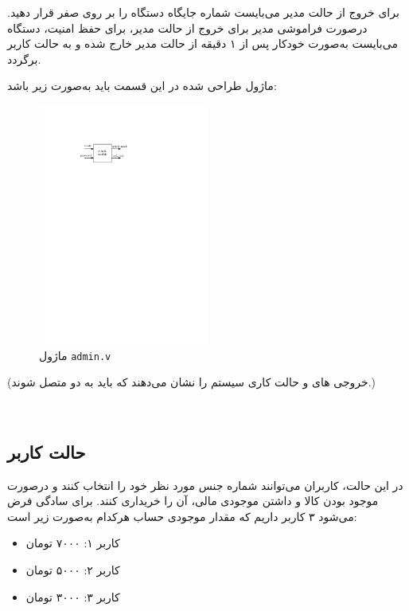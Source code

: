 \documentclass[]{article}
\begin{document}
برای خروج از حالت مدیر می‌بایست شماره جایگاه‌ دستگاه را بر روی صفر قرار دهید. درصورت فراموشی مدیر برای خروج از حالت مدیر، برای حفظ امنیت، دستگاه می‌بایست به‌صورت خودکار پس از ۱ دقیقه از حالت مدیر خارج شده و به حالت کاربر برگردد.



ماژول طراحی شده در این قسمت باید به‌صورت زیر باشد:


\begin{figure}[h]
	\centering
	\includegraphics[width=0.5\textwidth]{images/admin.pdf}
	\caption{ماژول \texttt{admin.v}}
	\label{ماژول admin.v}
\end{figure}

 (خروجی های  و  حالت کاری سیستم را نشان می‌دهند که باید به دو  متصل شوند.)



\newpage
\Large \textbf{\\
}




\subsection*{{\titr حالت کاربر}} 
در این حالت، کاربران می‌توانند شماره جنس مورد نظر خود را انتخاب کنند و درصورت موجود بودن کالا و داشتن موجودی مالی، آن را خریداری کنند. برای سادگی فرض می‌شود ۳ کاربر داریم که مقدار موجودی حساب هرکدام به‌صورت زیر است:

\begin{itemize}
	\item کاربر ۱: ۷۰۰۰ تومان
	\item کاربر ۲: ۵۰۰۰ تومان
	\item کاربر ۳: ۳۰۰۰ تومان 
\end{itemize}
\end{document}
